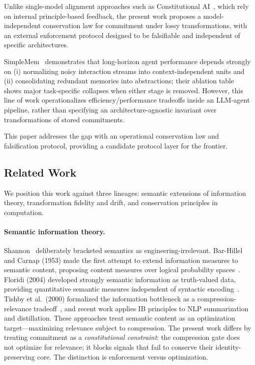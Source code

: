 \documentclass[11pt,a4paper]{article}
\begin{document}
Unlike single-model alignment approaches such as Constitutional AI~\cite{bai2022}, which rely on internal principle-based feedback, the present work proposes a model-independent conservation law for commitment under lossy transformations, with an external enforcement protocol designed to be falsifiable and independent of specific architectures.

SimpleMem~\cite{chen2026} demonstrates that long-horizon agent performance depends strongly on (i) normalizing noisy interaction streams into context-independent units and (ii) consolidating redundant memories into abstractions; their ablation table shows major task-specific collapses when either stage is removed. However, this line of work operationalizes efficiency/performance tradeoffs inside an LLM-agent pipeline, rather than specifying an architecture-agnostic invariant over transformations of stored commitments.

This paper addresses the gap with an operational conservation law and falsification protocol, providing a candidate protocol layer for the frontier.

\subsection{Related Work}
\label{sec:related-work}

We position this work against three lineages: semantic extensions of information theory, transformation fidelity and drift, and conservation principles in computation.

\paragraph{Semantic information theory.}
Shannon~\cite{shannon1948} deliberately bracketed semantics as engineering-irrelevant. Bar-Hillel and Carnap (1953) made the first attempt to extend information measures to semantic content, proposing content measures over logical probability spaces~\cite{barhillel1953}. Floridi (2004) developed strongly semantic information as truth-valued data, providing quantitative semantic measures independent of syntactic encoding~\cite{floridi2004}. Tishby et al.\ (2000) formalized the information bottleneck as a compression-relevance tradeoff~\cite{tishby2000}, and recent work applies IB principles to NLP summarization and distillation. These approaches treat semantic content as an optimization target---maximizing relevance subject to compression. The present work differs by treating commitment as a \emph{constitutional constraint}: the compression gate does not optimize for relevance; it blocks signals that fail to conserve their identity-preserving core. The distinction is enforcement versus optimization.
\end{document}
